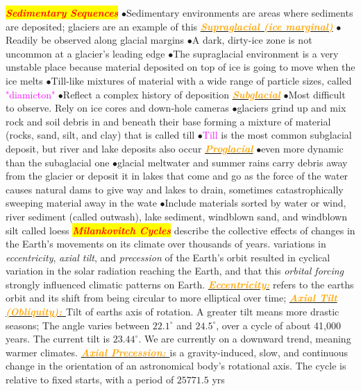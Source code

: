 \documentclass{article}
\newcommand{\ddd}{$\bullet$}
\newcommand{\red}[1]{\textcolor{red}{#1}}
\newcommand{\pink}[1]{\textcolor{magenta}{#1}}
\newcommand{\orange}[1]{\textcolor{orange}{#1}}
\newcommand{\mysection}[1]{\colorbox{yellow}{\textbf{\textit{\red{#1}}}}}
\newcommand{\mysub}[1]{\underline{\textbf{{\textit{\orange{#1}}}}}}
\newcommand{\vocab}[1]{{\pink{#1}}}
\begin{document}
\begin{multicols*}{4}
        \mysection{Sedimentary Sequences}
        \ddd Sedimentary environments are areas where sediments are deposited; glaciers are an example of this
        \mysub{Supraglacial (ice marginal)}
            \ddd Readily be observed along glacial margins
            \ddd A dark, dirty-ice zone is not uncommon at a glacier’s leading edge
            \ddd The supraglacial environment is a very unstable place because material deposited on top of ice is going to move when the ice melts
            \ddd Till-like mixtures of material with a wide range of particle sizes, called \vocab{"diamicton"}
            \ddd Reflect a complex history of deposition
        \mysub{Subglacial}
            \ddd Most difficult to observe. Rely on ice cores and down-hole cameras 
            \ddd glaciers grind up and mix rock and soil debris in and beneath their base forming a mixture of material (rocks, sand, silt, and clay) that is called till
            \ddd \vocab{Till} is the most common subglacial deposit, but river and lake deposits also occur 
        \mysub{Proglacial}
            \ddd even more dynamic than the subaglacial one
            \ddd glacial meltwater and summer rains carry debris away from the glacier or deposit it in lakes that come and go as the force of the water causes natural dams to give way and lakes to drain, sometimes catastrophically sweeping material away in the wate
            \ddd Include materials sorted by water or wind, river sediment (called outwash), lake sediment, windblown sand, and windblown silt called loess
        \mysection{Milankovitch Cycles}
         describe the collective effects of changes in the Earth's movements on its climate over thousands of years. variations in \textit{eccentricity}, \textit{axial tilt}, and \textit{precession} of the Earth's orbit resulted in cyclical variation in the solar radiation reaching the Earth, and that this \textit{orbital forcing} strongly influenced climatic patterns on Earth.
         \mysub{Eccentricity:} refers to the earths orbit and its shift from being circular to more elliptical over time;
        \mysub{Axial Tilt (Obliquity): }Tilt of earths axis of rotation. A greater tilt means more drastic seasons; The angle varies between $22.1^\circ$ and $24.5^\circ$, over a cycle of about 41,000 years. The current tilt is $23.44^\circ$. We are currently on a downward trend, meaning warmer climates.
        \mysub{Axial Precession: } is a gravity-induced, slow, and continuous change in the orientation of an astronomical body's rotational axis. The cycle is relative to fixed starts, with a period of $25771.5$ yrs

\end{multicols*}
\end{document}
